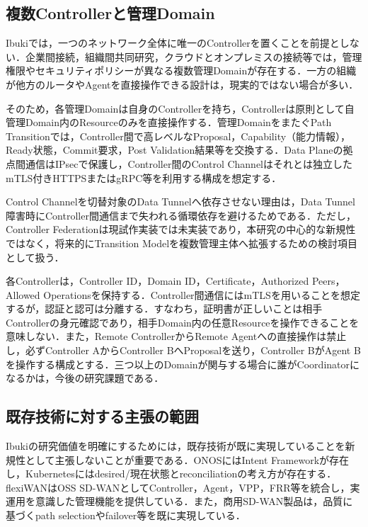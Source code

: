 \documentclass[11pt,a4paper,twoside]{ltjsarticle}
\begin{document}
\subsection{複数Controllerと管理Domain}

Ibukiでは，一つのネットワーク全体に唯一のControllerを置くことを前提としない．企業間接続，組織間共同研究，クラウドとオンプレミスの接続等では，管理権限やセキュリティポリシーが異なる複数管理Domainが存在する．一方の組織が他方のルータやAgentを直接操作できる設計は，現実的ではない場合が多い．

そのため，各管理Domainは自身のControllerを持ち，Controllerは原則として自管理Domain内のResourceのみを直接操作する．管理DomainをまたぐPath Transitionでは，Controller間で高レベルなProposal，Capability（能力情報），Ready状態，Commit要求，Post Validation結果等を交換する．Data Planeの拠点間通信はIPsecで保護し，Controller間のControl Channelはそれとは独立したmTLS付きHTTPSまたはgRPC等を利用する構成を想定する．

Control Channelを切替対象のData Tunnelへ依存させない理由は，Data Tunnel障害時にController間通信まで失われる循環依存を避けるためである．ただし，Controller Federationは現試作実装では未実装であり，本研究の中心的な新規性ではなく，将来的にTransition Modelを複数管理主体へ拡張するための検討項目として扱う．

各Controllerは，Controller ID，Domain ID，Certificate，Authorized Peers，Allowed Operationsを保持する．Controller間通信にはmTLSを用いることを想定するが，認証と認可は分離する．すなわち，証明書が正しいことは相手Controllerの身元確認であり，相手Domain内の任意Resourceを操作できることを意味しない．また，Remote ControllerからRemote Agentへの直接操作は禁止し，必ずController AからController BへProposalを送り，Controller BがAgent Bを操作する構成とする．三つ以上のDomainが関与する場合に誰がCoordinatorになるかは，今後の研究課題である．

\subsection{既存技術に対する主張の範囲}

Ibukiの研究価値を明確にするためには，既存技術が既に実現していることを新規性として主張しないことが重要である．ONOSにはIntent Frameworkが存在し，Kubernetesにはdesired/現在状態とreconciliationの考え方が存在する．flexiWANはOSS SD-WANとしてController，Agent，VPP，FRR等を統合し，実運用を意識した管理機能を提供している．また，商用SD-WAN製品は，品質に基づくpath selectionやfailover等を既に実現している．
\end{document}
